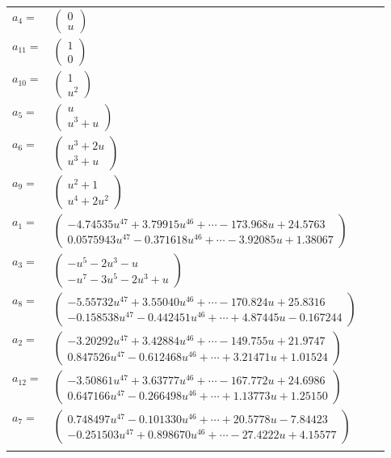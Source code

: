 \documentclass[1p]{elsarticle_modified}
\theoremstyle{definition}
\begin{document}
\begin{tabular}{m{7pt} m{180pt} m{7pt} m{180pt} }
\flushright $a_{4}=$&$\begin{pmatrix}0\\u\end{pmatrix}$ \\
\flushright $a_{11}=$&$\begin{pmatrix}1\\0\end{pmatrix}$ \\
\flushright $a_{10}=$&$\begin{pmatrix}1\\u^2\end{pmatrix}$ \\
\flushright $a_{5}=$&$\begin{pmatrix}u\\u^3+u\end{pmatrix}$ \\
\flushright $a_{6}=$&$\begin{pmatrix}u^3+2 u\\u^3+u\end{pmatrix}$ \\
\flushright $a_{9}=$&$\begin{pmatrix}u^2+1\\u^4+2 u^2\end{pmatrix}$ \\
\flushright $a_{1}=$&$\begin{pmatrix}-4.74535 u^{47}+3.79915 u^{46}+\cdots-173.968 u+24.5763\\0.0575943 u^{47}-0.371618 u^{46}+\cdots-3.92085 u+1.38067\end{pmatrix}$ \\
\flushright $a_{3}=$&$\begin{pmatrix}- u^5-2 u^3- u\\- u^7-3 u^5-2 u^3+u\end{pmatrix}$ \\
\flushright $a_{8}=$&$\begin{pmatrix}-5.55732 u^{47}+3.55040 u^{46}+\cdots-170.824 u+25.8316\\-0.158538 u^{47}-0.442451 u^{46}+\cdots+4.87445 u-0.167244\end{pmatrix}$ \\
\flushright $a_{2}=$&$\begin{pmatrix}-3.20292 u^{47}+3.42884 u^{46}+\cdots-149.755 u+21.9747\\0.847526 u^{47}-0.612468 u^{46}+\cdots+3.21471 u+1.01524\end{pmatrix}$ \\
\flushright $a_{12}=$&$\begin{pmatrix}-3.50861 u^{47}+3.63777 u^{46}+\cdots-167.772 u+24.6986\\0.647166 u^{47}-0.266498 u^{46}+\cdots+1.13773 u+1.25150\end{pmatrix}$ \\
\flushright $a_{7}=$&$\begin{pmatrix}0.748497 u^{47}-0.101330 u^{46}+\cdots+20.5778 u-7.84423\\-0.251503 u^{47}+0.898670 u^{46}+\cdots-27.4222 u+4.15577\end{pmatrix}$\\&\end{tabular}
\end{document}
